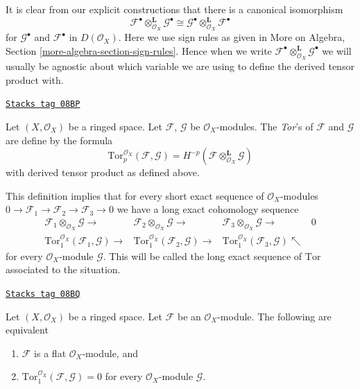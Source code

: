 It is clear from our explicit constructions that
there is a canonical isomorphism
$$
\mathcal{F}^\bullet \otimes_{\mathcal{O}_X}^{\mathbf{L}} \mathcal{G}^\bullet
\cong
\mathcal{G}^\bullet \otimes_{\mathcal{O}_X}^{\mathbf{L}} \mathcal{F}^\bullet
$$
for $\mathcal{G}^\bullet$ and $\mathcal{F}^\bullet$ in $D(\mathcal{O}_X)$.
Here we use sign rules as given in More on Algebra, Section
\ref{more-algebra-section-sign-rules}. Hence when we write
$\mathcal{F}^\bullet \otimes_{\mathcal{O}_X}^{\mathbf{L}} \mathcal{G}^\bullet$
we will usually be agnostic about which variable we are using to
define the derived tensor product with.

\begin{definition}[Tor]
\label{cohomology-definition-tor}
\href{https://stacks.math.columbia.edu/tag/08BP}{\texttt{Stacks tag 08BP}}

Let $(X, \mathcal{O}_X)$ be a ringed space.
Let $\mathcal{F}$, $\mathcal{G}$ be $\mathcal{O}_X$-modules.
The {\it Tor}'s of $\mathcal{F}$ and $\mathcal{G}$ are define by
the formula
$$
\text{Tor}_p^{\mathcal{O}_X}(\mathcal{F}, \mathcal{G}) =
H^{-p}(\mathcal{F} \otimes_{\mathcal{O}_X}^\mathbf{L} \mathcal{G})
$$
with derived tensor product as defined above.
\end{definition}

This definition implies that for every short exact sequence
of $\mathcal{O}_X$-modules
$0 \to \mathcal{F}_1 \to \mathcal{F}_2 \to \mathcal{F}_3 \to 0$
we have a long exact cohomology sequence
$$
\begin{array}{cccc}\mathcal{F}_1 \otimes_{\mathcal{O}_X} \mathcal{G} \longrightarrow & \mathcal{F}_2 \otimes_{\mathcal{O}_X} \mathcal{G} \longrightarrow & \mathcal{F}_3 \otimes_{\mathcal{O}_X} \mathcal{G} \longrightarrow & 0 \\ \text{Tor}_1^{\mathcal{O}_X}(\mathcal{F}_1, \mathcal{G}) \longrightarrow & \text{Tor}_1^{\mathcal{O}_X}(\mathcal{F}_2, \mathcal{G}) \longrightarrow & \text{Tor}_1^{\mathcal{O}_X}(\mathcal{F}_3, \mathcal{G}) \nwarrow & \end{array}
$$
for every $\mathcal{O}_X$-module $\mathcal{G}$. This will be called
the long exact sequence of $\text{Tor}$ associated to the situation.

\begin{lemma}
\label{cohomology-lemma-flat-tor-zero}
\href{https://stacks.math.columbia.edu/tag/08BQ}{\texttt{Stacks tag 08BQ}}


Let $(X, \mathcal{O}_X)$ be a ringed space.
Let $\mathcal{F}$ be an $\mathcal{O}_X$-module.
The following are equivalent
\begin{enumerate}
\item $\mathcal{F}$ is a flat $\mathcal{O}_X$-module, and
\item $\text{Tor}_1^{\mathcal{O}_X}(\mathcal{F}, \mathcal{G}) = 0$
for every $\mathcal{O}_X$-module $\mathcal{G}$.
\end{enumerate}
\end{lemma}

